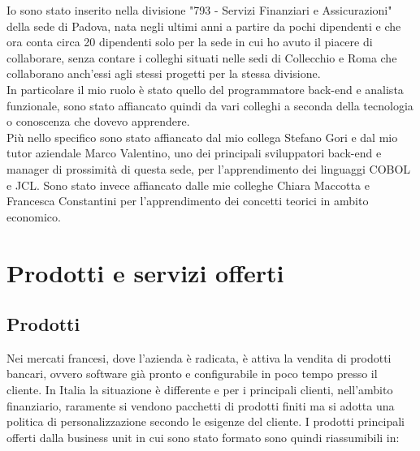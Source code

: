 Io sono stato inserito nella divisione "793 - Servizi Finanziari e Assicurazioni" della sede di Padova, nata negli ultimi anni a partire da pochi dipendenti e che ora conta circa 20 dipendenti solo per la sede in cui ho avuto il piacere di collaborare, senza contare i colleghi situati nelle sedi di Collecchio e Roma che collaborano anch'essi agli stessi progetti per la stessa divisione.\\
In particolare il mio ruolo è stato quello del programmatore back-end e analista funzionale, sono stato affiancato quindi da vari colleghi a seconda della tecnologia o conoscenza che dovevo apprendere. \\
Più nello specifico sono stato affiancato dal mio collega Stefano Gori e dal mio tutor aziendale Marco Valentino, uno dei principali sviluppatori back-end e manager di prossimità di questa sede, per l'apprendimento dei linguaggi COBOL e JCL. Sono stato invece affiancato dalle mie colleghe Chiara Maccotta e Francesca Constantini per l'apprendimento dei concetti teorici in ambito economico.%


\section{Prodotti e servizi offerti}
	
	\subsection{Prodotti}
	
	Nei mercati francesi, dove l'azienda è radicata, è attiva la vendita di prodotti bancari, ovvero software già pronto e configurabile in poco tempo presso il cliente. In Italia la situazione è differente e per i principali clienti, nell'ambito finanziario, raramente si vendono pacchetti di prodotti finiti ma si adotta una politica di personalizzazione secondo le esigenze del cliente. I prodotti principali offerti dalla business unit in cui sono stato formato sono quindi riassumibili in:
		
